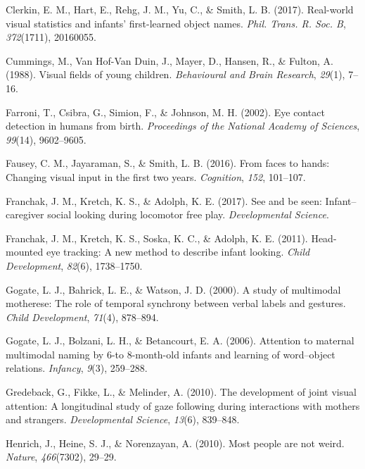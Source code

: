 \documentclass[english,man]{apa6}
\begin{document}
\hypertarget{ref-clerkin2017}{}
Clerkin, E. M., Hart, E., Rehg, J. M., Yu, C., \& Smith, L. B. (2017).
Real-world visual statistics and infants' first-learned object names.
\emph{Phil. Trans. R. Soc. B}, \emph{372}(1711), 20160055.

\hypertarget{ref-cummings1988}{}
Cummings, M., Van Hof-Van Duin, J., Mayer, D., Hansen, R., \& Fulton, A.
(1988). Visual fields of young children. \emph{Behavioural and Brain
Research}, \emph{29}(1), 7--16.

\hypertarget{ref-farroni2002eye}{}
Farroni, T., Csibra, G., Simion, F., \& Johnson, M. H. (2002). Eye
contact detection in humans from birth. \emph{Proceedings of the
National Academy of Sciences}, \emph{99}(14), 9602--9605.

\hypertarget{ref-fausey2016}{}
Fausey, C. M., Jayaraman, S., \& Smith, L. B. (2016). From faces to
hands: Changing visual input in the first two years. \emph{Cognition},
\emph{152}, 101--107.

\hypertarget{ref-franchak2017see}{}
Franchak, J. M., Kretch, K. S., \& Adolph, K. E. (2017). See and be
seen: Infant--caregiver social looking during locomotor free play.
\emph{Developmental Science}.

\hypertarget{ref-franchak2011}{}
Franchak, J. M., Kretch, K. S., Soska, K. C., \& Adolph, K. E. (2011).
Head-mounted eye tracking: A new method to describe infant looking.
\emph{Child Development}, \emph{82}(6), 1738--1750.

\hypertarget{ref-gogate2000study}{}
Gogate, L. J., Bahrick, L. E., \& Watson, J. D. (2000). A study of
multimodal motherese: The role of temporal synchrony between verbal
labels and gestures. \emph{Child Development}, \emph{71}(4), 878--894.

\hypertarget{ref-gogate2006attention}{}
Gogate, L. J., Bolzani, L. H., \& Betancourt, E. A. (2006). Attention to
maternal multimodal naming by 6-to 8-month-old infants and learning of
word--object relations. \emph{Infancy}, \emph{9}(3), 259--288.

\hypertarget{ref-gredeback2010development}{}
Gredeback, G., Fikke, L., \& Melinder, A. (2010). The development of
joint visual attention: A longitudinal study of gaze following during
interactions with mothers and strangers. \emph{Developmental Science},
\emph{13}(6), 839--848.

\hypertarget{ref-henrich2010most}{}
Henrich, J., Heine, S. J., \& Norenzayan, A. (2010). Most people are not
weird. \emph{Nature}, \emph{466}(7302), 29--29.
\end{document}
